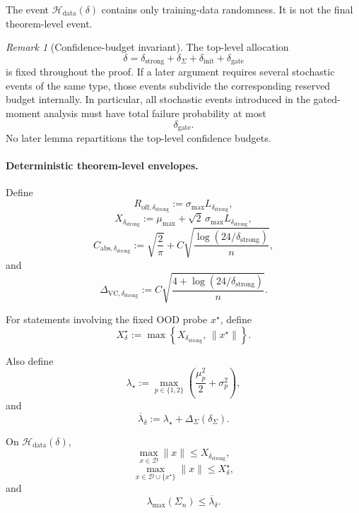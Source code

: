 \documentclass{article} %
\theoremstyle{plain}
\theoremstyle{definition}
\theoremstyle{remark}
\newtheorem{remark}[theorem]{Remark}
\begin{document}
The event $\mathcal H_{\mathrm{data}}(\delta)$ contains only training-data
randomness. It is not the final theorem-level event.

\begin{remark}[Confidence-budget invariant]
\label{rem:confidence-budget-invariant}
The top-level allocation
\[
\delta
=
\delta_{\mathrm{strong}}
+
\delta_{\Sigma}
+
\delta_{\mathrm{init}}
+
\delta_{\mathrm{gate}}
\]
is fixed throughout the proof. If a later argument requires several
stochastic events of the same type, those events subdivide the corresponding
reserved budget internally. In particular, all stochastic events introduced
in the gated-moment analysis must have total failure probability at most
\[
\delta_{\mathrm{gate}}.
\]
No later lemma repartitions the top-level confidence budgets.
\end{remark}


\paragraph{Deterministic theorem-level envelopes.}

Define
\[
\boxed{
R_{\mathrm{off},\delta_{\mathrm{strong}}}
:=
\sigma_{\max}L_{\delta_{\mathrm{strong}}},
}
\]
\[
\boxed{
X_{\delta_{\mathrm{strong}}}
:=
\mu_{\max}
+
\sqrt2\,\sigma_{\max}L_{\delta_{\mathrm{strong}}},
}
\]
\[
\boxed{
C_{\mathrm{abs},\delta_{\mathrm{strong}}}
:=
\sqrt{\frac2\pi}
+
C
\sqrt{
\frac{
\log(24/\delta_{\mathrm{strong}})
}{n}
},
}
\]
and
\[
\boxed{
\Delta_{\mathrm{VC},\delta_{\mathrm{strong}}}
:=
C
\sqrt{
\frac{
4+\log(24/\delta_{\mathrm{strong}})
}{n}
}.
}
\]

For statements involving the fixed OOD probe $x^\star$, define
\[
\boxed{
X_\delta^\star
:=
\max
\left\{
X_{\delta_{\mathrm{strong}}},
\,
\|x^\star\|
\right\}.
}
\]

Also define
\[
\lambda_\star
:=
\max_{p\in\{1,2\}}
\left(
\frac{\mu_p^2}{2}
+
\sigma_p^2
\right),
\]
and
\[
\boxed{
\overline\lambda_\delta
:=
\lambda_\star
+
\Delta_\Sigma(\delta_{\Sigma}).
}
\]

On $\mathcal H_{\mathrm{data}}(\delta)$,
\[
\boxed{
\max_{x\in\mathcal D}
\|x\|
\le
X_{\delta_{\mathrm{strong}}},
}
\]
\[
\boxed{
\max_{x\in\mathcal D\cup\{x^\star\}}
\|x\|
\le
X_\delta^\star,
}
\]
and
\[
\boxed{
\lambda_{\max}(\Sigma_n)
\le
\overline\lambda_\delta.
}
\]
\end{document}
